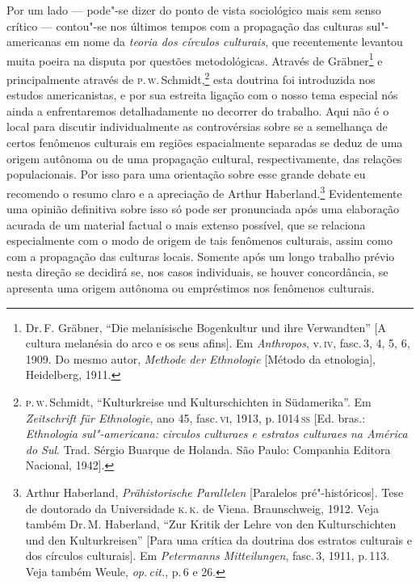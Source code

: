 Por um lado --- pode"-se dizer do ponto de vista sociológico mais sem
senso crítico --- contou"-se nos últimos tempos com a propagação das
culturas sul"-americanas em nome da \textit{teoria dos círculos culturais}, que recentemente levantou muita poeira na
disputa por questões metodológicas. Através de Gräbner\footnote{Dr.\,F. Gräbner,
  ``Die melanisische Bogenkultur und ihre Verwandten'' {[}A
  cultura melanésia do arco e os seus afins{]}. Em \textit{Anthropos}, v.\,\textsc{iv}, fasc.\,3, 4, 5, 6, 1909. Do mesmo autor, \textit{Methode der
  Ethnologie} {[}Método da etnologia{]}, Heidelberg, 1911.} e %
principalmente através de \textsc{p}.\,\textsc{w}.\,Schmidt,\footnote{\textsc{p.\,w}.\,Schmidt, ``Kulturkreise und Kulturschichten in Südamerika''. Em
  \textit{Zeitschrift für Ethnologie}, ano 45, fasc.\,\textsc{vi}, 1913, p.\,1014\,\textsc{ss} {[}Ed. bras.: \textit{Ethnologia sul"-americana: circulos culturaes e estratos culturaes na América do Sul}. Trad. Sérgio Buarque de Holanda. São Paulo: Companhia Editora Nacional, 1942{]}.} esta doutrina foi introduzida nos estudos
americanistas, e por sua estreita ligação com o nosso tema especial nós
ainda a enfrentaremos detalhadamente no decorrer do trabalho. Aqui não é
o local para discutir individualmente as controvérsias sobre se a
semelhança de certos fenômenos culturais em regiões espacialmente
separadas se deduz de uma origem autônoma ou de uma propagação
cultural, respectivamente, das relações populacionais. Por isso para uma
orientação sobre esse grande debate eu recomendo o resumo claro e a
apreciação de Arthur Haberland.\footnote{Arthur Haberland,
  \textit{Prähistorische Parallelen} {[}Paralelos pré"-históricos{]}. Tese
  de doutorado da Universidade \textsc{k.\,k.} de Viena. Braunschweig, 1912. Veja
  também Dr.\,M. Haberland, ``Zur Kritik der Lehre von den
  Kulturschichten und den Kulturkreisen'' {[}Para uma crítica da
  doutrina dos estratos culturais e dos círculos culturais{]}. Em
  \textit{Petermanns Mitteilungen}, fasc.\,3, 1911, p.\,113. Veja
  também Weule, \textit{op.\,cit.}, p.\,6 e 26.} Evidentemente uma opinião
definitiva sobre isso só pode ser pronunciada após uma elaboração
acurada de um material factual o mais extenso possível, que se
relaciona especialmente com o modo de origem de tais fenômenos
culturais, assim como com a propagação das culturas locais. Somente após
um longo trabalho prévio nesta direção se decidirá se, nos casos
individuais, se houver concordância, se apresenta uma origem autônoma ou
empréstimos nos fenômenos culturais.

